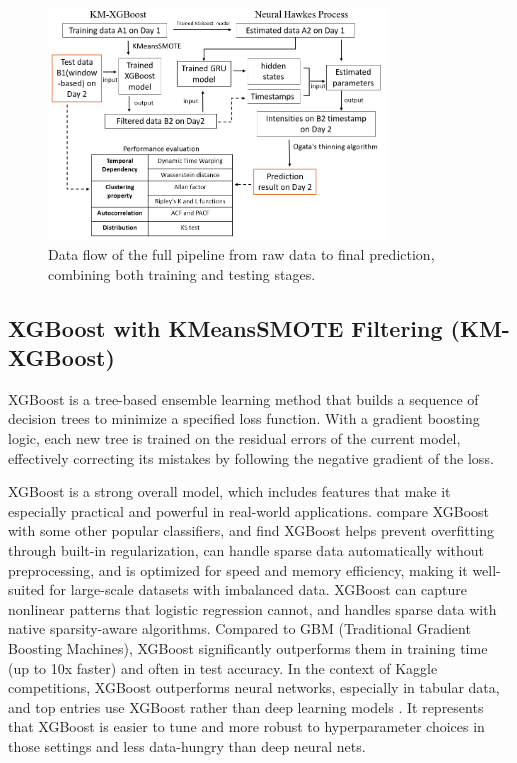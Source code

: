 \begin{figure}[H]
    \centering
    \includegraphics[width=0.8\textwidth]{figures/data_flow1.png}
    \caption{Data flow of the full pipeline from raw data to final prediction, combining both training and testing stages.}
    \label{fig:data-flow-diagram}
\end{figure}


\subsection{XGBoost with KMeansSMOTE Filtering (KM-XGBoost)}
XGBoost is a tree-based ensemble learning method that builds a sequence of decision trees to minimize a specified loss function. With a gradient boosting logic, each new tree is trained on the residual errors of the current model, effectively correcting its mistakes by following the negative gradient of the loss. 

XGBoost is a strong overall model, which includes features that make it especially practical and powerful in real-world applications. \cite{XGBoost_2016} compare XGBoost with some other popular classifiers, and find XGBoost helps prevent overfitting through built-in regularization, can handle sparse data automatically without preprocessing, and is optimized for speed and memory efficiency, making it well-suited for large-scale datasets with imbalanced data. XGBoost can capture nonlinear patterns that logistic regression cannot, and handles sparse data with native sparsity-aware algorithms. Compared to GBM (Traditional Gradient Boosting Machines), XGBoost significantly outperforms them in training time (up to 10x faster) and often in test accuracy. In the context of Kaggle competitions, XGBoost outperforms neural networks, especially in tabular data, and top entries use XGBoost rather than deep learning models \citep{XGBoost_2016}. It represents that XGBoost is easier to tune and more robust to hyperparameter choices in those settings and less data-hungry than deep neural nets.

